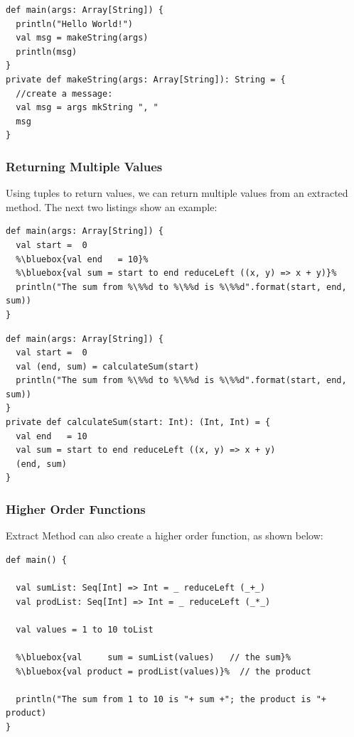 \documentclass[10pt,a4paper,oneside]{scrreprt}
\begin{document}
\begin{lstlisting}
def main(args: Array[String]) {
  println("Hello World!")
  val msg = makeString(args)
  println(msg)
}
private def makeString(args: Array[String]): String = {
  //create a message:
  val msg = args mkString ", "
  msg
}
\end{lstlisting}

\subsubsection{Returning Multiple Values}

Using tuples to return values, we can return multiple values from an extracted method. The next two listings show an example:

\begin{lstlisting}    
def main(args: Array[String]) {
  val start =  0
  %\bluebox{val end   = 10}%
  %\bluebox{val sum = start to end reduceLeft ((x, y) => x + y)}%
  println("The sum from %\%%d to %\%%d is %\%%d".format(start, end, sum))
}
\end{lstlisting}

\begin{lstlisting}        
def main(args: Array[String]) {
  val start =  0
  val (end, sum) = calculateSum(start)
  println("The sum from %\%%d to %\%%d is %\%%d".format(start, end, sum))
}
private def calculateSum(start: Int): (Int, Int) = {
  val end   = 10
  val sum = start to end reduceLeft ((x, y) => x + y)
  (end, sum)
}
\end{lstlisting}

\subsubsection{Higher Order Functions}

Extract Method can also create a higher order function, as shown below:

\begin{lstlisting}  
def main() {
  
  val sumList: Seq[Int] => Int = _ reduceLeft (_+_)
  val prodList: Seq[Int] => Int = _ reduceLeft (_*_)
  
  val values = 1 to 10 toList
  
  %\bluebox{val     sum = sumList(values)   // the sum}%
  %\bluebox{val product = prodList(values)}%  // the product

  println("The sum from 1 to 10 is "+ sum +"; the product is "+ product)
}
\end{lstlisting}
\end{document}
